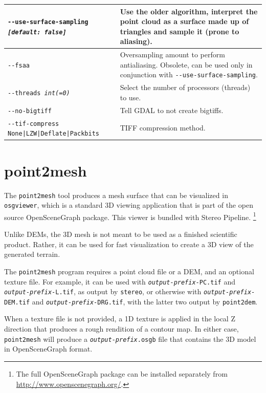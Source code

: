 \begin{longtable}{|p{8cm}|p{9cm}|}
\texttt{-\/-use-surface-sampling \textit{[default: false]}} & Use the older algorithm, interpret the point cloud as a surface made up of triangles and sample it (prone to aliasing).\\ \hline
\texttt{-\/-fsaa} & Oversampling amount to perform antialiasing. Obsolete, can be used only in conjunction with \texttt{-\/-use-surface-sampling}. \\ \hline
\texttt{-\/-threads \textit{int(=0)}} & Select the number of processors (threads) to use.\\ \hline
\texttt{-\/-no-bigtiff} & Tell GDAL to not create bigtiffs.\\ \hline
\texttt{-\/-tif-compress None|LZW|Deflate|Packbits} & TIFF compression method.\\ \hline
\hline
\end{longtable}

\section{point2mesh}
\label{point2mesh}

The \texttt{point2mesh} tool produces a mesh surface that can be
visualized in {\tt osgviewer}, which is a standard 3D viewing
application that is part of the open source OpenSceneGraph package.
This viewer is bundled with Stereo Pipeline.
\footnote{The full OpenSceneGraph package can be installed
separately from \url{http://www.openscenegraph.org/}.}

Unlike \acp{DEM}, the 3D mesh is not meant to be used as a finished
scientific product.  Rather, it can be used for fast visualization
to create a 3D view of the generated terrain.

The \texttt{point2mesh} program requires a point cloud file
or a DEM, and an optional texture file.
For example, it can be used with \texttt{\textit{output-prefix}-PC.tif} and
\texttt{\textit{output-prefix}-L.tif}, as output by \texttt{stereo},
or otherwise with \texttt{\textit{output-prefix}-DEM.tif} and
\texttt{\textit{output-prefix}-DRG.tif}, with the latter two output
by \texttt{point2dem}.

When a texture file is not provided, a 1D texture is applied in the local Z direction
that produces a rough rendition of a contour map.  In either case,
\texttt{point2mesh} will produce a \texttt{\textit{output-prefix}.osgb}
file that contains the 3D model in OpenSceneGraph format.

